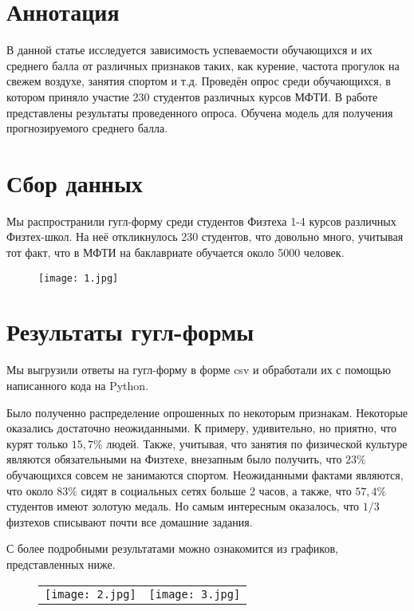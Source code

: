 \documentclass[a4paper,12pt]{article}
\begin{document}
\newpage

\section{Аннотация}
В данной статье исследуется зависимость успеваемости обучающихся и их среднего балла от различных признаков таких, как курение, частота прогулок на свежем воздухе, занятия спортом и т.д.
Проведён опрос среди обучающихся, в котором приняло участие 230 студентов различных курсов МФТИ. В работе представлены результаты проведенного опроса. Обучена модель для получения прогнозируемого среднего балла.
\section{Сбор данных}
Мы распространили гугл-форму среди студентов Физтеха 1-4 курсов различных Физтех-школ. На неё откликнулось 230 студентов,  что довольно много, учитывая тот факт, что в МФТИ на баклавриате обучается около 5000 человек. 
\begin{figure}[h!]
    \centering	
    \texttt{[image: 1.jpg]}
    \label{1_1}
\end{figure}

\section{Результаты гугл-формы}
Мы выгрузили ответы на гугл-форму в форме csv и обработали их с помощью написанного кода на Python. 

Было полученно распределение опрошенных по некоторым признакам. Некоторые оказались достаточно неожиданными. К примеру, удивительно, но приятно, что курят только $15,7\%$ людей. Также, учитывая, что занятия по физической культуре являются обязательными на Физтехе, внезапным было получить, что $23\%$ обучающихся совсем не занимаются спортом. Неожиданными фактами являются, что около $83\%$ сидят в социальных сетях больше 2 часов, а также, что $57,4 \%$ студентов имеют золотую медаль. Но самым интересным оказалось, что $1/3$ физтехов списывают почти все домашние задания. 

С более подробными результатами можно ознакомится из графиков, представленных ниже.
\begin{figure}[h!]
\begin{tabular}{cc}
\texttt{[image: 2.jpg]}
&
\texttt{[image: 3.jpg]}
\end{tabular}
\end{figure}
\newpage
\end{document}
